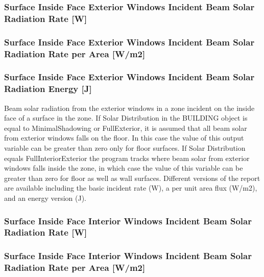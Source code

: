 \subsubsection{Surface Inside Face Exterior Windows Incident Beam Solar Radiation Rate {[}W{]}}\label{surface-inside-face-exterior-windows-incident-beam-solar-radiation-rate-w}

\subsubsection{Surface Inside Face Exterior Windows Incident Beam Solar Radiation Rate per Area {[}W/m2{]}}\label{surface-inside-face-exterior-windows-incident-beam-solar-radiation-rate-per-area-wm2}

\subsubsection{Surface Inside Face Exterior Windows Incident Beam Solar Radiation Energy {[}J{]}}\label{surface-inside-face-exterior-windows-incident-beam-solar-radiation-energy-j}

Beam solar radiation from the exterior windows in a zone incident on the inside face of a surface in the zone. If Solar Distribution in the BUILDING object is equal to MinimalShadowing or FullExterior, it is assumed that all beam solar from exterior windows falls on the floor. In this case the value of this output variable can be greater than zero only for floor surfaces. If Solar Distribution equals FullInteriorExterior the program tracks where beam solar from exterior windows falls inside the zone, in which case the value of this variable can be greater than zero for floor as well as wall surfaces. Different versions of the report are available including the basic incident rate (W), a per unit area flux (W/m2), and an energy version (J).

\subsubsection{Surface Inside Face Interior Windows Incident Beam Solar Radiation Rate {[}W{]}}\label{surface-inside-face-interior-windows-incident-beam-solar-radiation-rate-w}

\subsubsection{Surface Inside Face Interior Windows Incident Beam Solar Radiation Rate per Area {[}W/m2{]}}\label{surface-inside-face-interior-windows-incident-beam-solar-radiation-rate-per-area-wm2}

